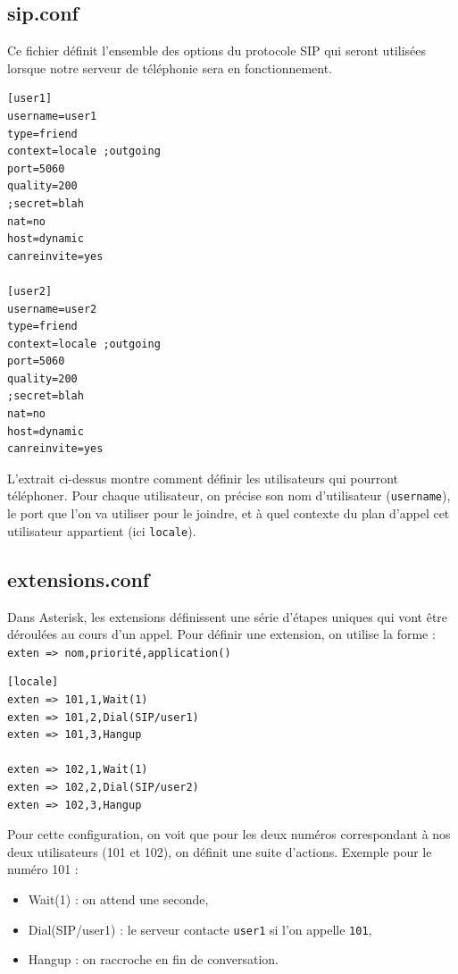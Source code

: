 \documentclass[12pt,a4paper,notitlepage]{article}
\begin{document}
\subsection{sip.conf}
Ce fichier définit l'ensemble des options du protocole SIP qui seront utilisées lorsque notre serveur de téléphonie sera en fonctionnement. \\
\begin{lstlisting}[title=sip.conf v1]
[user1]
username=user1
type=friend
context=locale ;outgoing
port=5060
quality=200
;secret=blah
nat=no
host=dynamic
canreinvite=yes

[user2]
username=user2
type=friend
context=locale ;outgoing
port=5060
quality=200
;secret=blah
nat=no
host=dynamic
canreinvite=yes
\end{lstlisting}

L'extrait ci-dessus montre comment définir les utilisateurs qui pourront téléphoner. Pour chaque utilisateur, on précise son nom d'utilisateur (\texttt{username}), le port que l'on va utiliser pour le joindre, et à quel contexte du plan d'appel cet utilisateur appartient (ici \texttt{locale}). 


\subsection{extensions.conf}

Dans Asterisk, les extensions définissent une série d'étapes uniques qui vont être déroulées au cours d'un appel. Pour définir une extension, on utilise la forme : \\

\noindent \texttt{exten => nom,priorité,application()}\\

\begin{lstlisting}[title=Extensions.conf v1]
[locale]
exten => 101,1,Wait(1)
exten => 101,2,Dial(SIP/user1)
exten => 101,3,Hangup

exten => 102,1,Wait(1)
exten => 102,2,Dial(SIP/user2)
exten => 102,3,Hangup
\end{lstlisting}

\clearpage
Pour cette configuration, on voit que pour les deux numéros correspondant à nos deux utilisateurs (101 et 102), on définit une suite d'actions. Exemple pour le numéro 101 :\bigskip

\begin{itemize}
\item Wait(1) : on attend une seconde,
\item Dial(SIP/user1) : le serveur contacte \texttt{user1} si l'on appelle \texttt{101},
\item Hangup : on raccroche en fin de conversation.
\end{itemize}
\end{document}
